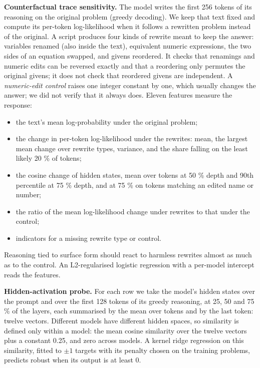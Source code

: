 \documentclass{article}
\providecommand{\tightlist}{\setlength{\itemsep}{0pt}\setlength{\parskip}{0pt}}
\begin{document}
\textbf{Counterfactual trace sensitivity.} The model writes the first 256 tokens of its reasoning on the original problem (greedy decoding). We keep that text fixed and compute its per-token log-likelihood when it follows a rewritten problem instead of the original. A script produces four kinds of rewrite meant to keep the answer: variables renamed (also inside the text), equivalent numeric expressions, the two sides of an equation swapped, and givens reordered. It checks that renamings and numeric edits can be reversed exactly and that a reordering only permutes the original givens; it does not check that reordered givens are independent. A \emph{numeric-edit control} raises one integer constant by one, which usually changes the answer; we did not verify that it always does. Eleven features measure the response:
\begin{itemize}
\tightlist
\item the text's mean log-probability under the original problem;
\item the change in per-token log-likelihood under the rewrites: mean, the largest mean change over rewrite types, variance, and the share falling on the least likely 20 \% of tokens;
\item the cosine change of hidden states, mean over tokens at 50 \% depth and 90th percentile at 75 \% depth, and at 75 \% on tokens matching an edited name or number;
\item the ratio of the mean log-likelihood change under rewrites to that under the control;
\item indicators for a missing rewrite type or control.
\end{itemize}
Reasoning tied to surface form should react to harmless rewrites almost as much as to the control. An L2-regularised logistic regression with a per-model intercept reads the features.

\textbf{Hidden-activation probe.} For each row we take the model's hidden states over the prompt and over the first 128 tokens of its greedy reasoning, at 25, 50 and 75 \% of the layers, each summarised by the mean over tokens and by the last token: twelve vectors. Different models have different hidden spaces, so similarity is defined only within a model: the mean cosine similarity over the twelve vectors plus a constant 0.25, and zero across models. A kernel ridge regression on this similarity, fitted to $\pm 1$ targets with its penalty chosen on the training problems, predicts robust when its output is at least 0.
\end{document}
